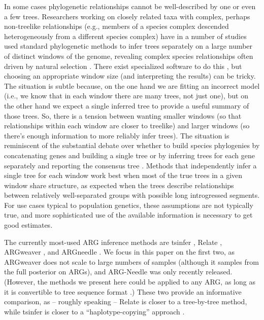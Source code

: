 \documentclass{article}
\begin{document}
In some cases phylogenetic relationships cannot be well-described by one or even a few trees.
Researchers working on closely related taxa
with complex, perhaps non-treelike relationships
(e.g., members of a species complex descended heterogeneously from a different species complex)
have in a number of studies used standard phylogenetic methods to infer trees separately
on a large number of distinct windows of the genome,
revealing complex species relationships often driven by natural selection \citep{pease,stankowski}.
There exist specialized software to do this \citep[e.g.,]{twist},
but choosing an appropriate window size (and interpreting the results) can be tricky.
The situation is subtle because, on the one hand we are fitting an incorrect model
(i.e., we know that in each window there are many trees, not just one),
but on the other hand we expect a single inferred tree to provide a useful summary of those trees.
So, there is a tension between wanting smaller windows
(so that relationships within each window are closer to treelike)
and larger windows (so there's enough information to more reliably infer trees).
The situation is reminiscent of the substantial debate over whether to build species phylogenies
by concatenating genes and building a single tree
or by inferring trees for each gene separately and reporting the consensus tree \cite{XXX}. %
Methods that independently infer a single tree for each window
work best when most of the true trees in a given window share structure,
as expected when the trees describe relationships between relatively well-separated groups
with possible long introgressed segments.
For use cases typical to population genetics,
these assumptions are not typically true,
and more sophisticated use of the available information is necessary to get good estimates.

The currently most-used ARG inference methods are tsinfer \cite{XXX}, Relate \cite{XXX}, ARGweaver \cite{XXX}, and ARGneedle \cite{XXX}.
We focus in this paper on the first two,
as ARGweaver does not scale to large numbers of samples (although it samples from the full posterior on ARGs),
and ARG-Needle was only recently released.
(However, the methods we present here could be applied to any ARG,
as long as it is convertible to tree sequence format \citep{ts}.)
These two provide an informative comparison, as -- roughly speaking --
Relate is closer to a tree-by-tree method,
while tsinfer is closer to a ``haplotype-copying'' approach \citep{li-and-stephens}.
\end{document}
